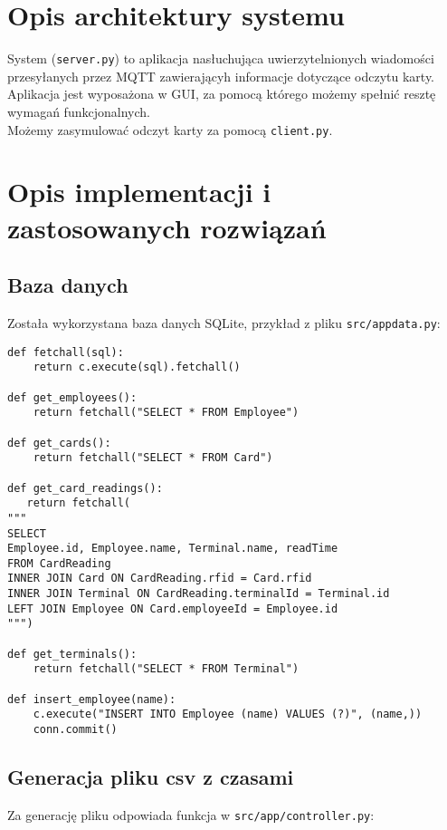 \documentclass[12pt,a4paper]{article}
\begin{document}
\section{Opis architektury systemu}

System (\texttt{server.py}) to aplikacja nasłuchująca uwierzytelnionych wiadomości przesyłanych przez MQTT zawierającyh informacje dotyczące odczytu karty.
Aplikacja jest wyposażona w GUI, za pomocą którego możemy spełnić resztę wymagań funkcjonalnych.\\
Możemy zasymulować odczyt karty za pomocą \texttt{client.py}.

\section{Opis implementacji i zastosowanych rozwiązań}
\subsection{Baza danych}
Została wykorzystana baza danych SQLite, przykład z pliku \texttt{src/appdata.py}:
\begin{verbatim}
def fetchall(sql):
    return c.execute(sql).fetchall()

def get_employees():
    return fetchall("SELECT * FROM Employee")

def get_cards():
    return fetchall("SELECT * FROM Card")

def get_card_readings():
   return fetchall(
"""
SELECT
Employee.id, Employee.name, Terminal.name, readTime
FROM CardReading
INNER JOIN Card ON CardReading.rfid = Card.rfid
INNER JOIN Terminal ON CardReading.terminalId = Terminal.id
LEFT JOIN Employee ON Card.employeeId = Employee.id
""")

def get_terminals():
    return fetchall("SELECT * FROM Terminal")

def insert_employee(name):
    c.execute("INSERT INTO Employee (name) VALUES (?)", (name,))
    conn.commit()
\end{verbatim}

\subsection{Generacja pliku csv z czasami}
Za generację pliku odpowiada funkcja w \texttt{src/app/controller.py}:
\end{document}
